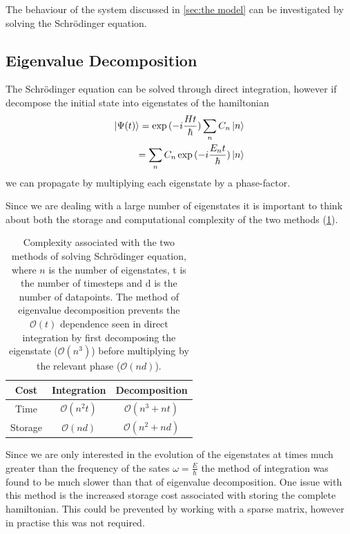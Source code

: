 The behaviour of the system
discussed in \cref{sec:the model}
can be investigated by
solving
the Schrödinger equation.

\subsection{Eigenvalue Decomposition}
The Schrödinger equation can
be solved through direct
integration, however
if decompose
the initial state
into eigenstates
of the hamiltonian
\begin{align}
    \ket{\Psi(t)} = \exp{(-i\frac{Ht}{\hbar})} \sum_n C_n \ket{n} \\
    = \sum_n C_n \exp{(-i\frac{E_n t}{\hbar})} \ket{n}
\end{align}
we can propagate
by multiplying each eigenstate
by a phase-factor.


Since we are dealing with a
large number of eigenstates
it is important to think
about both the storage
and computational complexity
of the two methods (\cref{tab:algorithm complexity}).
\begin{table}[htb]
    \begin{center}
        \begin{tabular}{ *{3}{c} }
            \toprule
            Cost    & Integration            & Decomposition              \\
            \midrule
            Time    & \(\mathcal{O}(n^2 t)\) & \(\mathcal{O}(n^3 + n t)\) \\
            Storage & \(\mathcal{O}(n d)\)   & \(\mathcal{O}(n^2 + n d)\) \\
            \bottomrule
        \end{tabular}
    \end{center}
    \caption{Complexity associated with the
        two methods of solving Schrödinger equation,
        where \(n\) is the number of eigenstates, t
        is the number of timesteps and d is the
        number of datapoints. The method
        of eigenvalue decomposition
        prevents the \(\mathcal{O}(t)\)
        dependence seen
        in direct integration
        by first decomposing the
        eigenstate (\(\mathcal{O}(n^3)\))
        before multiplying
        by the relevant phase
        (\(\mathcal{O}(nd)\)).
    }\label{tab:algorithm complexity}
\end{table}

Since we
are only interested in the
evolution of the eigenstates
at times much greater than
the frequency of the sates
\(\omega = \frac{E}{\hbar}\)
the method of integration
was found to be much
slower than that of eigenvalue
decomposition. One
issue with this method
is the increased storage
cost associated with
storing the complete
hamiltonian. This could
be prevented by
working with a sparse
matrix, however in
practise this
was not required.

